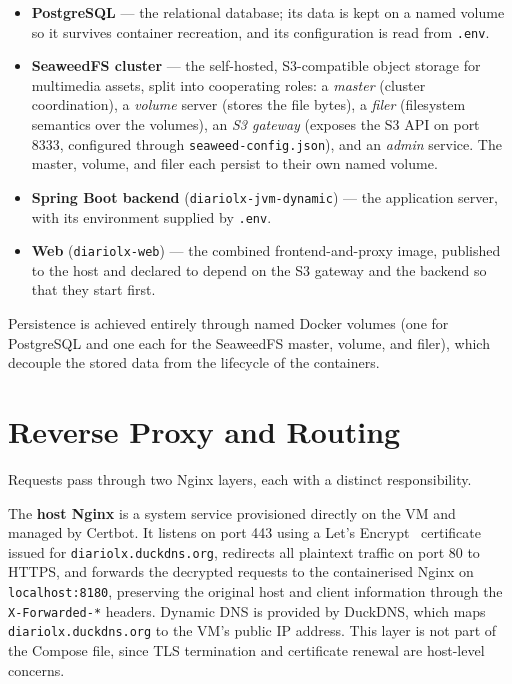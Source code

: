 \begin{itemize}
      \item \textbf{PostgreSQL} --- the relational database; its data is kept on a named
            volume so it survives container recreation, and its configuration is read
            from \texttt{.env}.

      \item \textbf{SeaweedFS cluster} --- the self-hosted, S3-compatible object storage
            for multimedia assets, split into cooperating roles: a \emph{master}
            (cluster coordination), a \emph{volume} server (stores the file bytes), a
            \emph{filer} (filesystem semantics over the volumes), an \emph{S3 gateway}
            (exposes the S3 API on port 8333, configured through
            \texttt{seaweed-config.json}), and an \emph{admin} service. The master,
            volume, and filer each persist to their own named volume.

      \item \textbf{Spring Boot backend} (\texttt{diariolx-jvm-dynamic}) --- the
            application server, with its environment supplied by \texttt{.env}.

      \item \textbf{Web} (\texttt{diariolx-web}) --- the combined frontend-and-proxy
            image, published to the host and declared to depend on the S3 gateway and the
            backend so that they start first.
\end{itemize}

Persistence is achieved entirely through named Docker volumes (one for PostgreSQL and
one each for the SeaweedFS master, volume, and filer), which decouple the stored data
from the lifecycle of the containers.

\section{Reverse Proxy and Routing} \label{sec:dep_proxy}

Requests pass through two Nginx layers, each with a distinct responsibility.

The \textbf{host Nginx} is a system service provisioned directly on the VM and managed
by Certbot. It listens on port 443 using a Let's Encrypt~\cite{letsencrypt} certificate issued for
\texttt{diariolx.duckdns.org}, redirects all plaintext traffic on port 80 to HTTPS,
and forwards the decrypted requests to the containerised Nginx on
\texttt{localhost:8180}, preserving the original host and client information through the
\texttt{X-Forwarded-*} headers. Dynamic DNS is provided by DuckDNS, which maps
\texttt{diariolx.duckdns.org} to the VM's public IP address. This layer is not part of
the Compose file, since TLS termination and certificate renewal are host-level
concerns.

